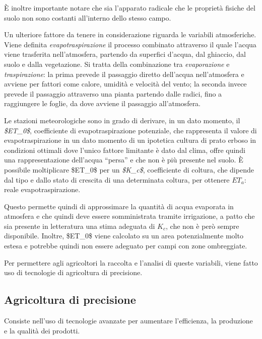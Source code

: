 \documentclass[12pt,a4paper,openright,twoside, openany]{book}
\begin{document}
È inoltre importante notare che sia l'apparato radicale che le proprietà fisiche del suolo non sono costanti all'interno dello stesso campo.

Un ulteriore fattore da tenere in considerazione riguarda le variabili atmosferiche. Viene definita \textit{evapotraspirazione} il processo combinato attraverso il quale l'acqua viene trasferita nell'atmosfera, partendo da superfici d'acqua, dal ghiaccio, dal suolo e dalla vegetazione\cite{Kirkham2014}. Si tratta della combinazione tra \textit{evaporazione} e \textit{traspirazione}: la prima prevede il passaggio diretto dell'acqua nell'atmosfera e avviene per fattori come calore, umidità e velocità del vento; la seconda invece prevede il passaggio attraverso una pianta partendo dalle radici, fino a raggiungere le foglie, da dove avviene il passaggio all'atmosfera.

Le stazioni meteorologiche\cite{Allen1998CropE} sono in grado di derivare, in un dato momento, il \textit{\ac{$ET_0$}}, coefficiente di evapotraspirazione potenziale, che rappresenta il valore di evapotraspirazione in un dato momento di un ipotetica cultura di prato erboso in condizioni ottimali dove l'unico fattore limitante è dato dal clima, offre quindi una rappresentazione dell'acqua ``persa'' e che non è più presente nel suolo. È possibile moltiplicare \ac{$ET_0$} per un \textit{\ac{$K_c$}}, coefficiente di coltura, che dipende dal tipo e dallo stato di crescita di una determinata coltura, per ottenere $ET_a$: reale evapotraspirazione.

Questo permette quindi di approssimare la quantità di acqua evaporata in atmosfera e che quindi deve essere somministrata tramite irrigazione, a patto che sia presente in letteratura una stima adeguata di $K_c$, che non è però sempre disponibile. Inoltre, \ac{$ET_0$} viene calcolato su un area potenzialmente molto estesa e potrebbe quindi non essere adeguato per campi con zone ombreggiate.

Per permettere agli agricoltori la raccolta e l'analisi di queste variabili, viene fatto uso di  tecnologie di agricoltura di precisione.

\subsection{Agricoltura di precisione}\label{agricoltura-precisione-tipi}

Consiste nell'uso di tecnologie avanzate per aumentare l'efficienza, la produzione e la qualità dei prodotti\cite{ZHANG2002113}.
\end{document}
